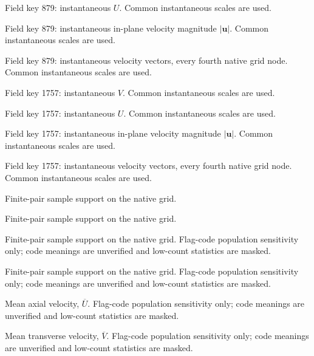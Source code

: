 \caption{Field key 879: instantaneous $U$. Common instantaneous scales are used.}

\caption{Field key 879: instantaneous in-plane velocity magnitude $|\mathbf{u}|$. Common instantaneous scales are used.}

\caption{Field key 879: instantaneous velocity vectors, every fourth native grid node. Common instantaneous scales are used.}

\caption{Field key 1757: instantaneous $V$. Common instantaneous scales are used.}

\caption{Field key 1757: instantaneous $U$. Common instantaneous scales are used.}

\caption{Field key 1757: instantaneous in-plane velocity magnitude $|\mathbf{u}|$. Common instantaneous scales are used.}

\caption{Field key 1757: instantaneous velocity vectors, every fourth native grid node. Common instantaneous scales are used.}

\caption{Finite-pair sample support on the native grid.}

\caption{Finite-pair sample support on the native grid.}

\caption{Finite-pair sample support on the native grid. Flag-code population sensitivity only; code meanings are unverified and low-count statistics are masked.}

\caption{Finite-pair sample support on the native grid. Flag-code population sensitivity only; code meanings are unverified and low-count statistics are masked.}

\caption{Mean axial velocity, $\overline{U}$. Flag-code population sensitivity only; code meanings are unverified and low-count statistics are masked.}

\caption{Mean transverse velocity, $\overline{V}$. Flag-code population sensitivity only; code meanings are unverified and low-count statistics are masked.}

